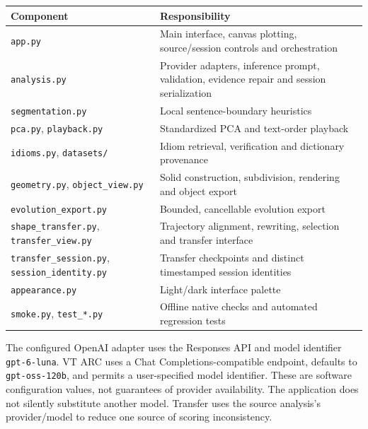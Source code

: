\documentclass[manuscript,screen,nonacm]{acmart}
\begin{document}
{ %
\begin{longtable}[]{@{}
  >{\raggedright\arraybackslash}p{}
  >{\raggedright\arraybackslash}p{}@{}}
\toprule\noalign{}
\begin{minipage}[b]{\linewidth}\raggedright
Component
\end{minipage} & \begin{minipage}[b]{\linewidth}\raggedright
Responsibility
\end{minipage} \\
\midrule\noalign{}
\endhead
\bottomrule\noalign{}
\endlastfoot
\nolinkurl{app.py} & Main interface, canvas plotting, source/session
controls and orchestration \\
\nolinkurl{analysis.py} & Provider adapters, inference prompt, validation,
evidence repair and session serialization \\
\nolinkurl{segmentation.py} & Local sentence-boundary heuristics \\
\nolinkurl{pca.py}, \nolinkurl{playback.py} & Standardized PCA and text-order
playback \\
\nolinkurl{idioms.py}, \nolinkurl{datasets/} & Idiom retrieval, verification
and dictionary provenance \\
\nolinkurl{geometry.py}, \nolinkurl{object_view.py} & Solid construction,
subdivision, rendering and object export \\
\nolinkurl{evolution_export.py} & Bounded, cancellable evolution export \\
\nolinkurl{shape_transfer.py}, \nolinkurl{transfer_view.py} & Trajectory
alignment, rewriting, selection and transfer interface \\
\nolinkurl{transfer_session.py}, \nolinkurl{session_identity.py} & Transfer
checkpoints and distinct timestamped session identities \\
\nolinkurl{appearance.py} & Light/dark interface palette \\
\nolinkurl{smoke.py}, \nolinkurl{test_*.py} & Offline native checks and
automated regression tests \\
\end{longtable}
}

The configured OpenAI adapter uses the Responses API and model
identifier \nolinkurl{gpt-6-luna}. VT ARC uses a Chat
Completions-compatible endpoint, defaults to \nolinkurl{gpt-oss-120b}, and
permits a user-specified model identifier. These are software
configuration values, not guarantees of provider availability. The
application does not silently substitute another model. Transfer uses
the source analysis's provider/model to reduce one source of scoring
inconsistency.
\end{document}
